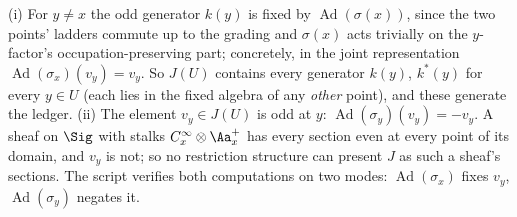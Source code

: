 (i) For $y \neq x$ the odd generator $k(y)$ is fixed by $\operatorname{Ad}(\sigma(x))$, since the two points' ladders commute up to the grading and $\sigma(x)$ acts trivially on the $y$-factor's occupation-preserving part; concretely, in the joint representation $\operatorname{Ad}(\sigma_x)(v_y) = v_y$. So $J(U)$ contains every generator $k(y)$, $k^{*}(y)$ for every $y \in U$ (each lies in the fixed algebra of any \emph{other} point), and these generate the ledger. (ii) The element $v_y \in J(U)$ is odd at $y$: $\operatorname{Ad}(\sigma_y)(v_y) = -v_y$. A sheaf on $\Sig$ with stalks $C^\infty_x \otimes \Aa_x^{+}$ has every section even at every point of its domain, and $v_y$ is not; so no restriction structure can present $J$ as such a sheaf's sections. The script verifies both computations on two modes: $\operatorname{Ad}(\sigma_x)$ fixes $v_y$, $\operatorname{Ad}(\sigma_y)$ negates it.
